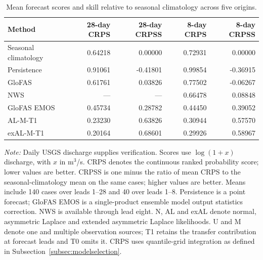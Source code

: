 \begin{table}[!htbp]
\centering
\begin{threeparttable}
\caption{Mean forecast scores and skill relative to seasonal climatology across five origins.}
\label{tab:comment2_external_comparison}
\fontsize{8.5}{10.5}\selectfont
\begin{tabular}{lrrrr}
\hline
Method & 28-day CRPS & 28-day CRPSS & 8-day CRPS & 8-day CRPSS \\
\hline
Seasonal climatology & 0.64218 & 0.00000 & 0.72931 & 0.00000 \\
Persistence & 0.91061 & -0.41801 & 0.99854 & -0.36915 \\
GloFAS & 0.61761 & 0.03826 & 0.77502 & -0.06267 \\
NWS & --- & --- & 0.66478 & 0.08848 \\
GloFAS EMOS & 0.45734 & 0.28782 & 0.44450 & 0.39052 \\
AL-M-T1 & 0.23230 & 0.63826 & 0.30944 & 0.57570 \\
exAL-M-T1 & 0.20164 & 0.68601 & 0.29926 & 0.58967 \\
\hline
\end{tabular}
\begin{tablenotes}
\fontsize{8}{10}\selectfont
\item \textit{Note:} Daily USGS discharge supplies verification. Scores use $\log(1+x)$ discharge, with $x$ in m$^3$/s. CRPS denotes the continuous ranked probability score; lower values are better. CRPSS is one minus the ratio of mean CRPS to the seasonal-climatology mean on the same cases; higher values are better. Means include 140 cases over leads 1--28 and 40 over leads 1--8. Persistence is a point forecast; GloFAS EMOS is a single-product ensemble model output statistics correction. NWS is available through lead eight. N, AL and exAL denote normal, asymmetric Laplace and extended asymmetric Laplace likelihoods. U and M denote one and multiple observation sources; T1 retains the transfer contribution at forecast leads and T0 omits it. CRPS uses quantile-grid integration as defined in Subsection~\ref{subsec:modelselection}.
\end{tablenotes}
\end{threeparttable}
\end{table}
